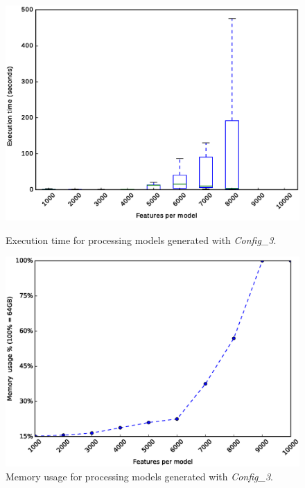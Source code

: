 \begin{figure}[h]
	\centering
	\begin{minipage}[b]{0.48\textwidth}
		\includegraphics[width=\textwidth]{boxplot_0_5.eps}
		\caption{Execution time for processing models generated with \textit{Config\_3}.}\label{fig:plot:probs:boxplot_0_5}
	\end{minipage}
	\hfill
	\begin{minipage}[b]{0.48\textwidth}
		\includegraphics[width=\textwidth]{boxplot_0_5_mem.eps}
		\caption{Memory usage for processing models generated with \textit{Config\_3}.}\label{fig:plot:probs:boxplot_0_5_mem}
	\end{minipage}
\end{figure}



